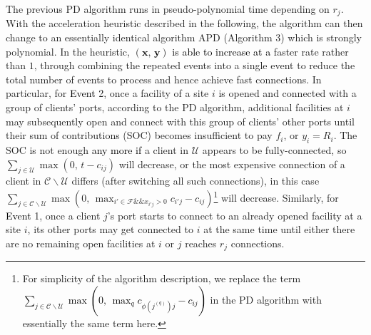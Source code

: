 \documentclass[10pt]{llncs}
\begin{document}
The previous PD algorithm runs in pseudo-polynomial time depending
on $r_{j}$. With the acceleration heuristic described in the following,
the algorithm can then change to an essentially identical algorithm
APD (Algorithm 3) which is strongly polynomial. In the heuristic,\textcolor{black}{{}
$\left(\boldsymbol{x},\,\boldsymbol{y}\right)$ is able to increase
at a }faster rate\textcolor{black}{{} }rather than $1$, through combining
the repeated events into a single event to reduce the total number
of events to process and hence achieve fast connections. In particular,
for \textcolor{black}{Event }2, once a facility of a site $i$ is
opened and connected with a group of clients' ports, according to
the PD algorithm, additional facilities at $i$ may subsequently open
and connect with this group of clients' other ports until their sum
of contributions (SOC) becomes insufficient to pay $f_{i}$, or $y_{i}=R_{i}$.
The SOC is not enough \textcolor{black}{any more if} a client in $\mathcal{U}$
appears to be fully-connected, so $\sum_{j\in\mathcal{U}}\max\left(0,\, t-c_{ij}\right)$
will decrease, or the most expensive connection of a client in $\mathcal{C}\backslash\mathcal{U}$
differs (after switching all such connections), in this case $\sum_{j\in\mathcal{C}\backslash\mathcal{U}}\max\left(0,\,\max_{i'\in\mathcal{F}\&\&x_{i'j}>0}c_{i'j}-c_{ij}\right)$\footnote{For simplicity of the algorithm description, we replace the term \textcolor{black}{$\sum_{j\in\mathcal{C}\backslash\mathcal{U}}\max\left(0,\,\max_{q}c_{\phi\left(j^{\left(q\right)}\right)j}-c_{ij}\right)$}
in the PD algorithm with essentially the same term here.} will decrease. Similarly, for \textcolor{black}{Event }1, once a
client $j$'s port starts to connect to an already opened facility
at a site $i$, its other ports may get connected to $i$ at the same
time until either there are no remaining open facilities at $i$ or
$j$ reaches $r_{j}$ connections. 
\end{document}
